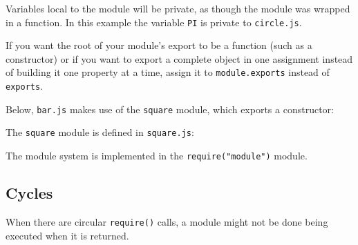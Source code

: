 Variables local to the module will be private, as though the module was
wrapped in a function. In this example the variable \texttt{PI} is
private to \texttt{circle.js}.

If you want the root of your module's export to be a function (such as a
constructor) or if you want to export a complete object in one
assignment instead of building it one property at a time, assign it to
\texttt{module.exports} instead of \texttt{exports}.

Below, \texttt{bar.js} makes use of the \texttt{square} module, which
exports a constructor:

\begin{Shaded}
\begin{Highlighting}[]
 \NormalTok{(}\NormalTok{);}
 \NormalTok{(}\NormalTok{);}
\NormalTok{(} \NormalTok{+ }\NormalTok{());}
\end{Highlighting}
\end{Shaded}

The \texttt{square} module is defined in \texttt{square.js}:

\begin{Shaded}
\begin{Highlighting}[]
 \NormalTok{= }
   \NormalTok{\{}
    \NormalTok{: }\NormalTok{() \{}
       
    \NormalTok{\}}
  \NormalTok{\};}
\NormalTok{\}}
\end{Highlighting}
\end{Shaded}

The module system is implemented in the \texttt{require("module")}
module.

\subsection{Cycles}\label{cycles}

When there are circular \texttt{require()} calls, a module might not be
done being executed when it is returned.

